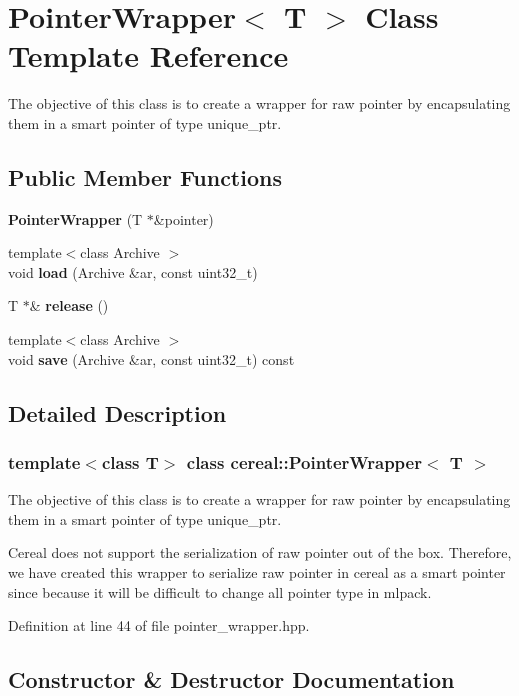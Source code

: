 \section{Pointer\+Wrapper$<$ T $>$ Class Template Reference}
\label{classcereal_1_1PointerWrapper}


The objective of this class is to create a wrapper for raw pointer by encapsulating them in a smart pointer of type unique\+\_\+ptr.  


\subsection*{Public Member Functions}
\begin{DoxyCompactItemize}
\item 
\textbf{ Pointer\+Wrapper} (T $\ast$\&pointer)
\item 
{\footnotesize template$<$class Archive $>$ }\\void \textbf{ load} (Archive \&ar, const uint32\+\_\+t)
\item 
T $\ast$\& \textbf{ release} ()
\item 
{\footnotesize template$<$class Archive $>$ }\\void \textbf{ save} (Archive \&ar, const uint32\+\_\+t) const
\end{DoxyCompactItemize}


\subsection{Detailed Description}
\subsubsection*{template$<$class T$>$\newline
class cereal\+::\+Pointer\+Wrapper$<$ T $>$}

The objective of this class is to create a wrapper for raw pointer by encapsulating them in a smart pointer of type unique\+\_\+ptr. 

Cereal does not support the serialization of raw pointer out of the box. Therefore, we have created this wrapper to serialize raw pointer in cereal as a smart pointer since because it will be difficult to change all pointer type in mlpack. 

Definition at line 44 of file pointer\+\_\+wrapper.\+hpp.



\subsection{Constructor \& Destructor Documentation}
\mbox{\label{classcereal_1_1PointerWrapper_a65ffc92800be3b2e2acd6bf27c7d8745}} 
